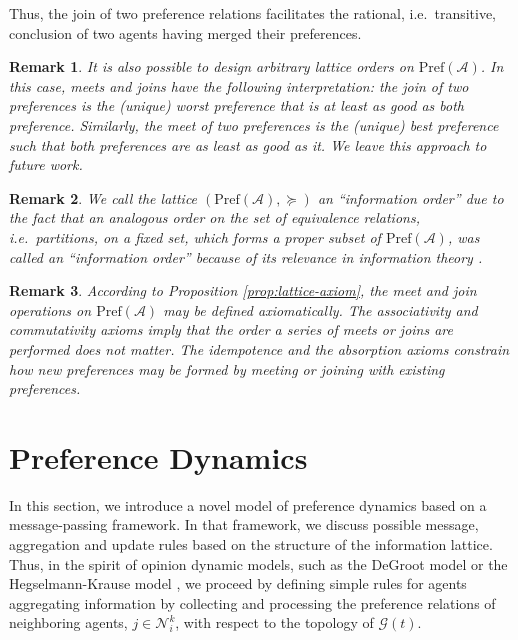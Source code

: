 \documentclass[conference]{ieeeconf}
\newcommand{\N}{\mathcal{N}}
\newcommand{\A}{\mathcal{A}}
\newcommand{\Pref}{\mathrm{Pref}}
\newcommand{\graph}{\mathcal{G}}
\newtheorem{remark}{Remark}
\begin{document}
Thus, the join of two preference relations facilitates the rational, i.e.~transitive, conclusion of two agents having merged their preferences.

\begin{remark}
    It is also possible to design arbitrary lattice orders on $\Pref(\A)$. In this case, meets and joins have the following interpretation: the join of two preferences is the (unique) worst preference that is at least as good as both preference. Similarly, the meet of two preferences is the (unique) best preference such that both preferences are as least as good as it. We leave this approach to future work.
\end{remark}
\begin{remark}
    We call the lattice $(\Pref(\A), \succeq)$ an ``information order'' due to the fact that an analogous order on the set of equivalence relations, i.e.~partitions, on a fixed set, which forms a proper subset of $\Pref(\A)$, was called an ``information order'' because of its relevance in information theory \cite{shannon}.
\end{remark}
\begin{remark}
    According to Proposition \ref{prop:lattice-axiom}, the meet and join operations on $\Pref(\A)$ may be defined axiomatically. The associativity and commutativity axioms imply that the order a series of meets or joins are performed does not matter. The idempotence and the absorption axioms constrain how new preferences may be formed by meeting or joining with existing preferences.
\end{remark}


\section{Preference Dynamics}
\label{sec:dynamics}

In this section, we introduce a novel model of preference dynamics based on a message-passing framework. In that framework, we discuss possible message, aggregation and update rules based on the structure of the information lattice. Thus, in the spirit of opinion dynamic models, such as the DeGroot model \cite{degroot1974} or the Hegselmann-Krause model \cite{hegselmann2002}, we proceed by defining simple rules for agents aggregating information by collecting and processing the preference relations of neighboring agents, $j \in \N_i^k$, with respect to the topology of $\graph(t)$.
\end{document}
